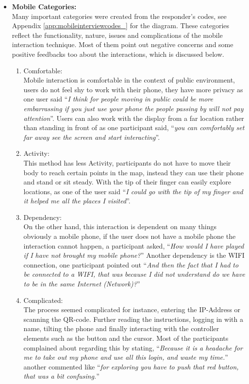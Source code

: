 \begin{itemize}

\item \textbf{Mobile Categories:} \\
Many important categories were created from the responder's codes, see Appendix \ref{app:mobileinterviewcodes_} for the diagram. These categories reflect the functionality, nature, issues and complications of the mobile interaction technique. Most of them point out negative concerns and some positive feedbacks too about the interactions, which is discussed below.

\begin{enumerate}
\item	Comfortable: \\
	Mobile interaction is comfortable in the context of public environment, users do not feel shy to work with their phone, they have more privacy as one user said ``\emph{I think for people moving in public could be more embarrassing if you just use your phone the people passing by will not pay attention}''. Users can also work with the display from a far location rather than standing in front of as one participant said, ``\emph{you can comfortably set far away see the screen and start interacting}''.
\item	Activity: \\
	This method has less Activity, participants do not have to move their body to reach certain points in the map, instead they can use their phone and stand or sit steady. With the tip of their finger can easily explore locations, as one of the user said ``\emph{I could go with the tip of my finger and it helped me all the places I visited}''.
\item	Dependency:\\
	On the other hand, this interaction is dependent on many things obviously a mobile phone, if the user does not have a mobile phone the interaction cannot happen, a participant asked, ``\emph{How would I have played if I have not brought my mobile phone?}'' Another dependency is the WIFI connection, one participant pointed out ``\emph{And then the fact that I had to be connected to a WIFI, that was because I did not understand do we have to be in the same Internet (Network)?}'' 

\item	Complicated:\\
The process seemed complicated for instance, entering the IP-Address or scanning the QR-code. Further reading the instructions, logging in with a name, tilting the phone and finally interacting with the controller elements such as the button and the cursor. Most of the participants complained about regarding this by stating, ``\emph{Because it is a headache for me to take out my phone and use all this login, and waste my time.}'' another commented like ``\emph{for exploring you have to push that red button, that was a bit confusing.}''



\end{enumerate}
\end{itemize}
